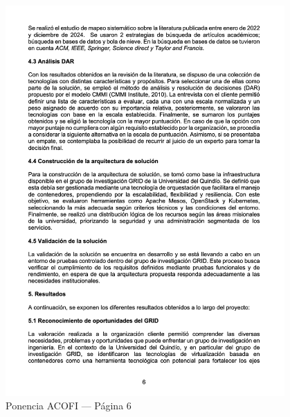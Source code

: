 \begin{figure}[H]
    \centering
    \begin{tcolorbox}[
        colback=white,
        colframe=gray!50,
        boxrule=1pt,
        arc=2pt,
        boxsep=5pt,
        left=3pt,
        right=3pt,
        top=3pt,
        bottom=3pt,
        drop shadow
    ]
        \includegraphics[width=0.95\textwidth,keepaspectratio]{apendices/ACOFI/pagina_6.png}
    \end{tcolorbox}
    \caption{Ponencia ACOFI --- Página 6}\label{fig:acofi-pagina-6}
\end{figure}
\FloatBarrier%
